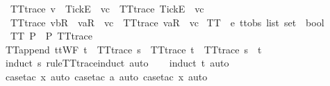\begin{isabellebody}
\ \ {\isachardoublequoteopen}TT{}{\isacharunderscore}trace\ {\isacharparenleft}v\ {\isacharhash}\ {\isacharbrackleft}Tick{\isacharbrackright}\isactrlsub E\ {\isacharhash}\ vc{\isacharparenright}\ {\isacharequal}\ TT{}{\isacharunderscore}trace\ {\isacharparenleft}{\isacharbrackleft}Tick{\isacharbrackright}\isactrlsub E\ {\isacharhash}\ vc{\isacharparenright}{\isachardoublequoteclose}\ {\isacharbar}\isanewline
\ \ {\isachardoublequoteopen}TT{}{\isacharunderscore}trace\ {\isacharparenleft}{\isacharbrackleft}vb{\isacharbrackright}\isactrlsub R\ {\isacharhash}\ {\isacharbrackleft}va{\isacharbrackright}\isactrlsub R\ {\isacharhash}\ vc{\isacharparenright}\ {\isacharequal}\ TT{}{\isacharunderscore}trace\ {\isacharparenleft}{\isacharbrackleft}va{\isacharbrackright}\isactrlsub R\ {\isacharhash}\ vc{\isacharparenright}{\isachardoublequoteclose}\isanewline
\isanewline
{}\isamarkupfalse%
\ TT{}\ {\isacharcolon}{\isacharcolon}\ {\isachardoublequoteopen}{\isacharprime}e\ ttobs\ list\ set\ {\isasymRightarrow}\ bool{\isachardoublequoteclose}\ \isanewline
\ \ {\isachardoublequoteopen}TT{}\ P\ {\isacharequal}\ {\isacharparenleft}{\isasymforall}{\isasymrho}{\isasymin}P{\isachardot}\ TT{}{\isacharunderscore}trace\ {\isasymrho}{\isacharparenright}{\isachardoublequoteclose}\isanewline
\isanewline
{}\isamarkupfalse%
\ TT{}{\isacharunderscore}append{\isacharcolon}\ {\isachardoublequoteopen}ttWF\ t\ {\isasymLongrightarrow}\ TT{}{\isacharunderscore}trace\ s\ {\isasymLongrightarrow}\ TT{}{\isacharunderscore}trace\ t\ {\isasymLongrightarrow}\ TT{}{\isacharunderscore}trace\ {\isacharparenleft}s\ {\isacharat}\ t{\isacharparenright}{\isachardoublequoteclose}\isanewline
%
\isadelimproof
\ \ %
\endisadelimproof
%
\isatagproof
{}\isamarkupfalse%
\ {\isacharparenleft}induct\ s\ rule{\isacharcolon}TT{}{\isacharunderscore}trace{\isachardot}induct{\isacharcomma}\ auto{\isacharparenright}\isanewline
\ \ \isamarkupfalse%
\ {\isacharparenleft}induct\ t{\isacharcomma}\ auto{\isacharparenright}\isanewline
\ \ \isamarkupfalse%
\ {\isacharparenleft}case{\isacharunderscore}tac\ x{\isacharcomma}\ auto{\isacharcomma}\ case{\isacharunderscore}tac\ a{\isacharcomma}\ auto{\isacharcomma}\ case{\isacharunderscore}tac\ x{}{\isacharcomma}\ auto{\isacharparenright}\isanewline
\ \ \isamarkupfalse%
%
\endisatagproof
{\isafoldproof}%
%
\isadelimproof

\end{isabellebody}
